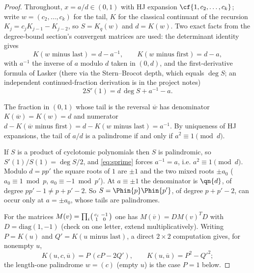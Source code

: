 \begin{proof}
Throughout, $x=a/d\in(0,1)$ with HJ expansion $\cf{1,c_2,\dots,c_k}$; write
$w=(c_2,\dots,c_k)$ for the tail, $K$ for the classical continuant of the
recursion $K_j=c_jK_{j-1}-K_{j-2}$, so $S=K_q(w)$ and $d=K(w)$. Two exact
facts from the degree-bound section's convergent matrices are used: the
determinant identity gives
\[
  K(w\text{ minus last})=d-a^{-1},
  \qquad
  K(w\text{ minus first})=d-a,
\]
with $a^{-1}$ the inverse of $a$ modulo $d$ taken in $(0,d)$, and the
first-derivative formula of Lasker \cite[Lem.~6.1, Cor.~6.2]{Lasker} (there via
the Stern--Brocot depth, which equals $\deg S$; an independent
continued-fraction derivation is in the project notes)
\begin{equation}\tag{D}\label{eq:sprime}
  2S'(1)=d\,\deg S+a^{-1}-a .
\end{equation}

 The fraction in $(0,1)$ whose tail is the reversal
$\overline{w}$ has denominator $K(\overline w)=K(w)=d$ and numerator
$d-K(\overline w\text{ minus first})=d-K(w\text{ minus last})=a^{-1}$. By
uniqueness of HJ expansions, the tail of $a/d$ is a palindrome if and only if
$a^{2}\equiv1\pmod d$.

 If $S$ is a
product of cyclotomic polynomials then $S$ is palindromic, so
$S'(1)/S(1)=\deg S/2$, and \eqref{eq:sprime} forces $a^{-1}=a$, i.e.
$a^{2}\equiv1\pmod d$. Modulo $d=pp'$ the square roots of $1$ are $\pm1$ and
the two mixed roots $\pm a_0$ ($a_0\equiv1\bmod p$, $a_0\equiv-1\bmod p'$).
At $a\equiv\pm1$ the denominator is $\qn{d}$, of degree $pp'-1\ne p+p'-2$. So
$S=\Phin{p}\Phin{p'}$, of degree $p+p'-2$, can occur only at $a=\pm a_0$,
whose tails are palindromes.

 For the matrices
$M(v)=\prod_i\begin{psmallmatrix}c_i&-1\\1&0\end{psmallmatrix}$ one has
$M(\overline v)=DM(v)^{T}D$ with $D=\mathrm{diag}(1,-1)$ (check on one letter,
extend multiplicatively). Writing $P=K(u)$ and $Q'=K(u\text{ minus last})$, a
direct $2\times2$ computation gives, for nonempty $u$,
\[
  K(u,c,\overline u)=P\,(cP-2Q'),
  \qquad
  K(u,\overline u)=P^{2}-Q'^{2};
\]
the length-one palindrome $w=(c)$ (empty $u$) is the case $P=1$ below.


\end{proof}
